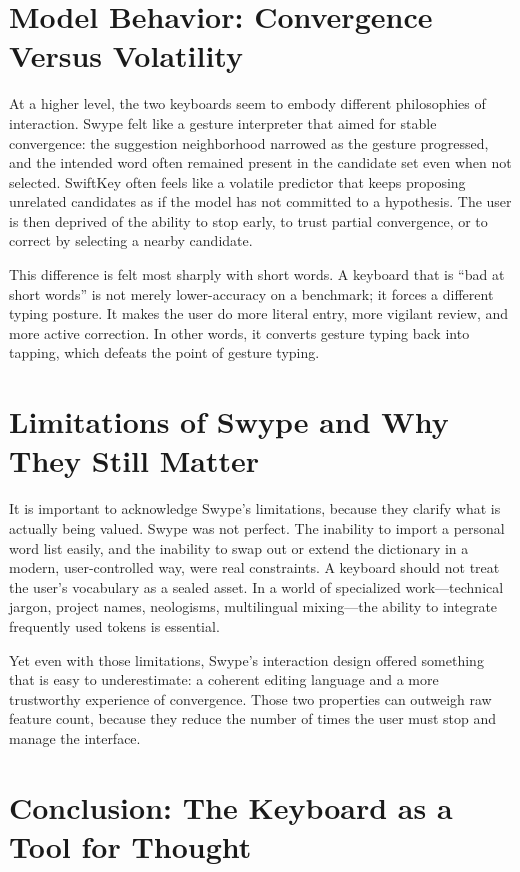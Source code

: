\documentclass[11pt]{article}
\begin{document}
\section{Model Behavior: Convergence Versus Volatility}

At a higher level, the two keyboards seem to embody different philosophies of interaction. Swype felt like a gesture interpreter that aimed for stable convergence: the suggestion neighborhood narrowed as the gesture progressed, and the intended word often remained present in the candidate set even when not selected. SwiftKey often feels like a volatile predictor that keeps proposing unrelated candidates as if the model has not committed to a hypothesis. The user is then deprived of the ability to stop early, to trust partial convergence, or to correct by selecting a nearby candidate.

This difference is felt most sharply with short words. A keyboard that is ``bad at short words'' is not merely lower-accuracy on a benchmark; it forces a different typing posture. It makes the user do more literal entry, more vigilant review, and more active correction. In other words, it converts gesture typing back into tapping, which defeats the point of gesture typing.

\section{Limitations of Swype and Why They Still Matter}

It is important to acknowledge Swype's limitations, because they clarify what is actually being valued. Swype was not perfect. The inability to import a personal word list easily, and the inability to swap out or extend the dictionary in a modern, user-controlled way, were real constraints. A keyboard should not treat the user's vocabulary as a sealed asset. In a world of specialized work---technical jargon, project names, neologisms, multilingual mixing---the ability to integrate frequently used tokens is essential.

Yet even with those limitations, Swype's interaction design offered something that is easy to underestimate: a coherent editing language and a more trustworthy experience of convergence. Those two properties can outweigh raw feature count, because they reduce the number of times the user must stop and manage the interface.

\section{Conclusion: The Keyboard as a Tool for Thought}
\end{document}
